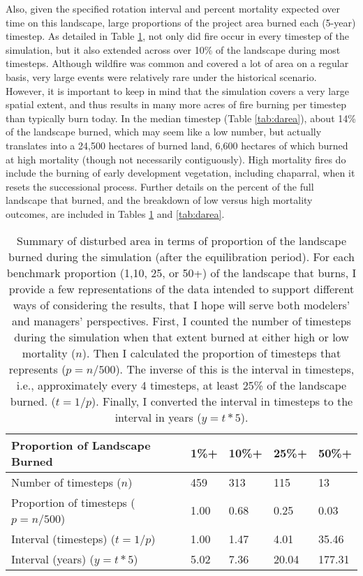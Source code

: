 Also, given the specified rotation interval and percent mortality expected over time on this landscape, large proportions of the project area burned each (5-year) timestep. As detailed in Table \ref{tab:darea_atleast}, not only did fire occur in every timestep of the simulation, but it also extended across over 10\% of the landscape during most timesteps. Although wildfire was common and covered a lot of area on a regular basis, very large events were relatively rare under the historical scenario. However, it is important to keep in mind that the simulation covers a very large spatial extent, and thus results in many more acres of fire burning per timestep than typically burn today. In the median timestep (Table \ref{tab:darea}), about 14\% of the landscape burned, which may seem like a low number, but actually translates into a 24,500 hectares of burned land, 6,600 hectares of which burned at high mortality (though not necessarily contiguously). High mortality fires do include the burning of early development vegetation, including chaparral, when it resets the successional process. Further details on the percent of the full landscape that burned, and the breakdown of low versus high mortality outcomes, are included in Tables \ref{tab:darea_atleast} and \ref{tab:darea}.

\begin{table}[!htbp]
\small
\centering
\caption{Summary of disturbed area in terms of proportion of the landscape burned during the simulation (after the equilibration period). For each benchmark proportion (1,10, 25, or 50+) of the landscape that burns, I provide a few representations of the data intended to support different ways of considering the results, that I hope will serve both modelers' and managers' perspectives. First, I counted the number of timesteps during the simulation when that extent burned at either high or low mortality ($n$). Then I calculated the proportion of timesteps that represents ($p = n/500$). The inverse of this is the interval in timesteps, i.e., approximately every 4 timesteps, at least 25\% of the landscape burned. ($t = 1/p$). Finally, I converted the interval in timesteps to the interval in years ($y = t * 5$).}
\label{tab:darea_atleast}
\begin{tabular}{@{}lllll@{}}
\toprule
\textbf{Proportion of Landscape Burned} & \textbf{1\%+}     & \textbf{10\%+}    & \textbf{25\%+}    & \textbf{50\%+} \\ \midrule
Number of timesteps ($n$)        & 459              & 313              & 115              & 13            \\
Proportion of timesteps ($p = n/500$)    & 1.00             & 0.68             & 0.25             & 0.03          \\
Interval (timesteps) ($t = 1/p$)      & 1.00             & 1.47             & 4.01             & 35.46         \\
Interval (years)    ($y = t * 5$)       & 5.02             & 7.36             & 20.04            & 177.31        \\ \bottomrule
\end{tabular}
\end{table}

